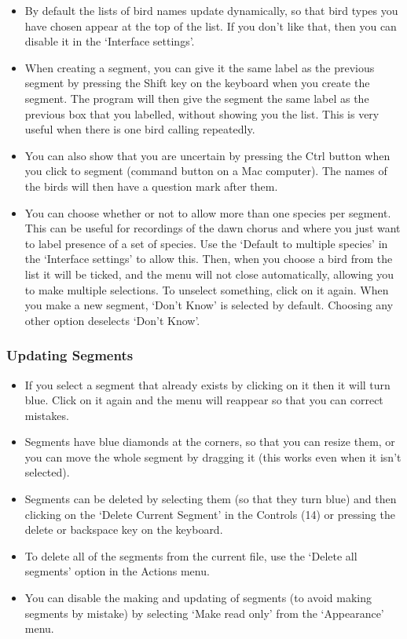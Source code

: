\documentclass{article}
\begin{document}
\begin{itemize}
\item By default the lists of bird names update dynamically, so that bird types you have chosen appear at the top of the list. If you don't like that, then you can disable it in the `Interface settings'. 

\item When creating a segment, you can give it the same label as the previous segment by pressing the Shift key on the keyboard when you create the segment. The program will then give the segment the same label as the previous box that you labelled, without showing you the list. This is very useful when there is one bird calling repeatedly.

\item You can also show that you are uncertain by pressing the Ctrl button when you click to segment (command button on a Mac computer). The names of the birds will then have a question mark after them.

\item You can choose whether or not to allow more than one species per segment. This can be useful for recordings of the dawn chorus and where you just want to label presence of a set of species. Use the `Default to multiple species' in the `Interface settings' to allow this. Then, when you choose a bird from the list it will be ticked, and the menu will not close automatically, allowing you to make multiple selections. To unselect something, click on it again. When you make a new segment, `Don't Know' is selected by default. Choosing any other option deselects `Don't Know'.

\end{itemize}

\subsubsection*{Updating Segments}

\begin{itemize}
\item If you select a segment that already exists by clicking on it then it will turn blue. Click on it again and the menu will reappear so that you can correct mistakes. 
\item Segments have blue diamonds at the corners, so that you can resize them, or you can move the whole segment by dragging it (this works even when it isn't selected). 
\item Segments can be deleted by selecting them (so that they turn blue) and then clicking on the `Delete Current Segment' in the Controls (14) or pressing the delete or backspace key on the keyboard. 
\item To delete all of the segments from the current file, use the `Delete all segments' option in the Actions menu. 
\item You can disable the making and updating of segments (to avoid making segments by mistake) by selecting `Make read only' from the `Appearance' menu.
\end{itemize}
\end{document}
